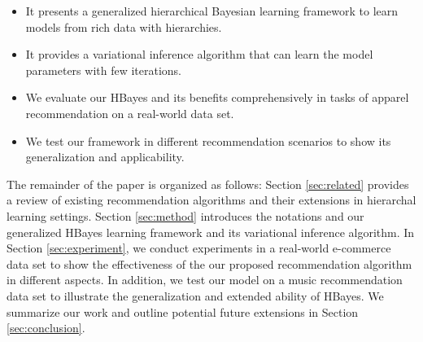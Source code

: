 \begin{itemize}
\item It presents a generalized hierarchical Bayesian learning framework to learn models from rich data with hierarchies.
\item It provides a variational inference algorithm that can learn the model parameters with few iterations.
\item We evaluate our HBayes and its benefits comprehensively in tasks of apparel recommendation on a real-world data set. 
\item We test our framework in different recommendation scenarios to show its generalization and applicability.
\end{itemize}

The remainder of the paper is organized as follows: Section \ref{sec:related} provides a review of existing recommendation algorithms and their extensions in hierarchal learning settings. Section \ref{sec:method} introduces the notations and our generalized HBayes learning framework and its variational inference algorithm. In Section \ref{sec:experiment}, we conduct experiments in a real-world e-commerce data set to show the effectiveness of the our proposed recommendation algorithm in different aspects. In addition, we test our model on a music recommendation data set to illustrate the generalization and extended ability of HBayes. We summarize our work and outline potential future extensions in Section \ref{sec:conclusion}.


